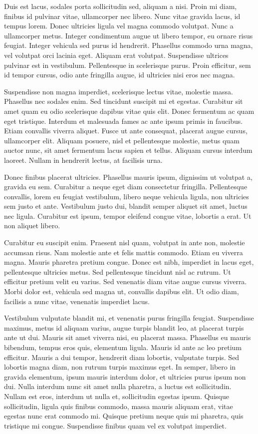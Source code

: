 Duis est lacus, sodales porta sollicitudin sed, aliquam a nisi. Proin mi diam, finibus id pulvinar vitae, ullamcorper nec libero. Nunc vitae gravida lacus, id tempus lorem. Donec ultricies ligula vel magna commodo volutpat. Nunc a ullamcorper metus. Integer condimentum augue ut libero tempor, eu ornare risus feugiat. Integer vehicula sed purus id hendrerit. Phasellus commodo urna magna, vel volutpat orci lacinia eget. Aliquam erat volutpat. Suspendisse ultrices pulvinar est in vestibulum. Pellentesque in scelerisque purus. Proin efficitur, sem id tempor cursus, odio ante fringilla augue, id ultricies nisi eros nec magna.

Suspendisse non magna imperdiet, scelerisque lectus vitae, molestie massa. Phasellus nec sodales enim. Sed tincidunt suscipit mi et egestas. Curabitur sit amet quam eu odio scelerisque dapibus vitae quis elit. Donec fermentum ac quam eget tristique. Interdum et malesuada fames ac ante ipsum primis in faucibus. Etiam convallis viverra aliquet. Fusce ut ante consequat, placerat augue cursus, ullamcorper elit. Aliquam posuere, nisl et pellentesque molestie, metus quam auctor nunc, sit amet fermentum lacus sapien et tellus. Aliquam cursus interdum laoreet. Nullam in hendrerit lectus, at facilisis urna.

Donec finibus placerat ultricies. Phasellus mauris ipsum, dignissim ut volutpat a, gravida eu sem. Curabitur a neque eget diam consectetur fringilla. Pellentesque convallis, lorem eu feugiat vestibulum, libero neque vehicula ligula, non ultricies sem justo et ante. Vestibulum justo dui, blandit semper aliquet sit amet, luctus nec ligula. Curabitur est ipsum, tempor eleifend congue vitae, lobortis a erat. Ut non aliquet libero.

Curabitur eu suscipit enim. Praesent nisl quam, volutpat in ante non, molestie accumsan risus. Nam molestie ante et felis mattis commodo. Etiam eu viverra magna. Mauris pharetra pretium congue. Donec est nibh, imperdiet in lacus eget, pellentesque ultricies metus. Sed pellentesque tincidunt nisl ac rutrum. Ut efficitur pretium velit eu varius. Sed venenatis diam vitae augue cursus viverra. Morbi dolor est, vehicula sed magna ut, convallis dapibus elit. Ut odio diam, facilisis a nunc vitae, venenatis imperdiet lacus.

Vestibulum vulputate blandit mi, et venenatis purus fringilla feugiat. Suspendisse maximus, metus id aliquam varius, augue turpis blandit leo, at placerat turpis ante ut dui. Mauris sit amet viverra nisi, eu placerat massa. Phasellus eu mauris bibendum, tempus eros quis, elementum ligula. Mauris id ante ac leo pretium efficitur. Mauris a dui tempor, hendrerit diam lobortis, vulputate turpis. Sed lobortis magna diam, non rutrum turpis maximus eget. In semper, libero in gravida elementum, ipsum mauris interdum dolor, et ultricies purus ipsum non dui. Nulla interdum nunc sit amet nulla pharetra, a luctus est sollicitudin. Nullam est eros, interdum ut nulla et, sollicitudin egestas ipsum. Quisque sollicitudin, ligula quis finibus commodo, massa mauris aliquam erat, vitae egestas nunc erat commodo mi. Quisque pretium neque quis mi pharetra, quis tristique mi congue. Suspendisse finibus quam vel ex volutpat imperdiet.

